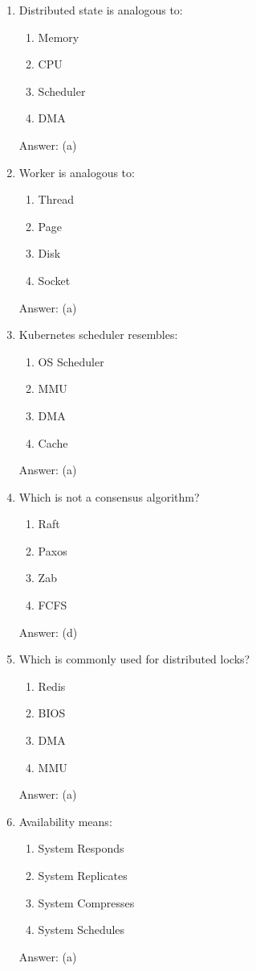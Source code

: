 \begin{enumerate}
\item Distributed state is analogous to:
\begin{enumerate}[label=(\alph*)]
\item Memory
\item CPU
\item Scheduler
\item DMA
\end{enumerate}
Answer: (a)

\item Worker is analogous to:
\begin{enumerate}[label=(\alph*)]
\item Thread
\item Page
\item Disk
\item Socket
\end{enumerate}
Answer: (a)

\item Kubernetes scheduler resembles:
\begin{enumerate}[label=(\alph*)]
\item OS Scheduler
\item MMU
\item DMA
\item Cache
\end{enumerate}
Answer: (a)

\item Which is not a consensus algorithm?
\begin{enumerate}[label=(\alph*)]
\item Raft
\item Paxos
\item Zab
\item FCFS
\end{enumerate}
Answer: (d)

\item Which is commonly used for distributed locks?
\begin{enumerate}[label=(\alph*)]
\item Redis
\item BIOS
\item DMA
\item MMU
\end{enumerate}
Answer: (a)

\item Availability means:
\begin{enumerate}[label=(\alph*)]
\item System Responds
\item System Replicates
\item System Compresses
\item System Schedules
\end{enumerate}
Answer: (a)


\end{enumerate}
